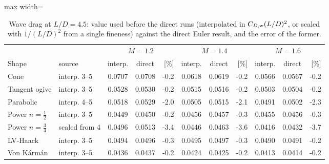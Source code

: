 \begin{table}[H]
\centering
\caption{Wave drag at $L/D = 4.5$: value used before the direct runs (interpolated in $C_{D,\rm w}(L/D)^2$, or scaled with $1/(L/D)^2$ from a single fineness) against the direct Euler result, and the error of the former.}
\label{tab:check45}
\small
\begin{adjustbox}{max width=\textwidth}
\begin{tabular}{@{}llccrccrccr@{}}
\toprule
 & & \multicolumn{3}{c}{$M=1.2$} & \multicolumn{3}{c}{$M=1.4$} & \multicolumn{3}{c}{$M=1.6$} \\
Shape & source & interp. & direct & [\%] & interp. & direct & [\%] & interp. & direct & [\%] \\
\midrule
Cone & interp. 3--5 & 0.0707 & 0.0708 & -0.2 & 0.0618 & 0.0619 & -0.2 & 0.0566 & 0.0567 & -0.2 \\
Tangent ogive & interp. 3--5 & 0.0528 & 0.0530 & -0.2 & 0.0515 & 0.0516 & -0.2 & 0.0503 & 0.0504 & -0.2 \\
Parabolic & interp. 4--5 & 0.0518 & 0.0529 & -2.0 & 0.0505 & 0.0515 & -2.1 & 0.0491 & 0.0502 & -2.3 \\
Power $n=\tfrac12$ & interp. 3--5 & 0.0449 & 0.0450 & -0.2 & 0.0456 & 0.0457 & -0.3 & 0.0455 & 0.0456 & -0.3 \\
Power $n=\tfrac34$ & scaled from 4 & 0.0496 & 0.0513 & -3.4 & 0.0446 & 0.0463 & -3.6 & 0.0416 & 0.0432 & -3.7 \\
LV-Haack & interp. 3--5 & 0.0494 & 0.0496 & -0.3 & 0.0495 & 0.0497 & -0.3 & 0.0490 & 0.0491 & -0.2 \\
Von K\'arm\'an & interp. 3--5 & 0.0436 & 0.0437 & -0.2 & 0.0424 & 0.0425 & -0.2 & 0.0413 & 0.0414 & -0.2 \\
\bottomrule
\end{tabular}
\end{adjustbox}
\end{table}
